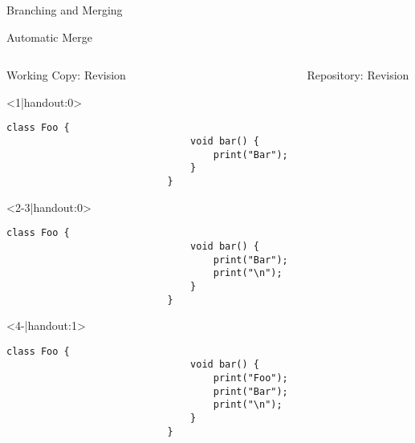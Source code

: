 
\slideMergePull{}

\slideIgnore{}

\begin{frame}{Branching and Merging}
	\slideBranchingAndMerging{}
\end{frame}

\begin{frame}[fragile]{Automatic Merge} %
	\begin{columns}[onlytextwidth]
		\begin{column}{0.6\linewidth}
			\begin{columns}[T]
				\begin{column}{0.5\linewidth}
					Working Copy: Revision \only<4>{\emph{11$^*$}}\\[2mm]
					
					\begin{onlyenv}<1|handout:0>
						\begin{lstlisting}[style=java,basicstyle=\fontfamily{pcr}\small\selectfont,numbers=none,escapechar=|]
							class Foo {
								void bar() {
									print("Bar");
								}
							}	
						\end{lstlisting}
					\end{onlyenv}
					\begin{onlyenv}
						\begin{lstlisting}[style=java,basicstyle=\fontfamily{pcr}\small\selectfont,numbers=none,escapechar=|]
							class Foo {
								void bar() {
									print("Bar");
									print("\n");
								}
							}	
						\end{lstlisting}
					\end{onlyenv}
					\begin{onlyenv}
						\begin{lstlisting}[style=java,basicstyle=\fontfamily{pcr}\small\selectfont,numbers=none,escapechar=|]
							class Foo {
								void bar() {
									print("Foo");
									print("Bar");
									print("\n");
								}
							}	
						\end{lstlisting}
					\end{onlyenv}
				\end{column}
				\begin{column}{0.5\linewidth}					
					Repository: Revision \only<3->{\emph{11}}
					

\end{column}
\end{columns}
\end{column}
\end{columns}
\end{frame}
